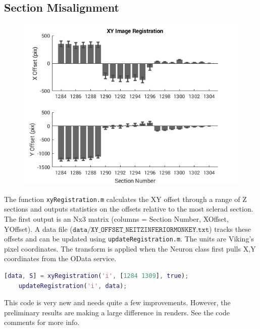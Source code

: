 \documentclass[12pt]{exam}
\begin{document}
	\subsection{Section Misalignment}
	\begin{figure}
		\includegraphics[width=\linewidth]{xyAlign}
	\end{figure}
	The function \texttt{xyRegistration.m} calculates the XY offset through a range of Z sections and outputs statistics on the offsets relative to the most sclerad section. The first output is an Nx3 matrix (columns = Section Number, XOffset, YOffset). A data file ($\mathtt{data/XY\_OFFSET\_NEITZINFERIORMONKEY.txt}$) tracks these offsets and can be updated using \texttt{updateRegistration.m}. The units are Viking's pixel coordinates. The transform is applied when the Neuron class first pulls X,Y coordinates from the OData service. 
	\begin{lstlisting}[language=matlab]
	[data, S] = xyRegistration('i', [1284 1309], true);
	updateRegistration('i', data);\end{lstlisting}
	This code is very new and needs quite a few improvements. However, the preliminary results are making a large difference in renders. See the code comments for more info.
\end{document}
